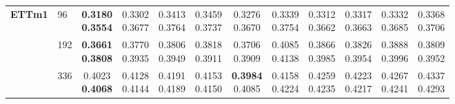 \begin{longtable}{@{}llcccccccccc@{}}
\textbf{ETTm1} & 96 & \shortstack{\colorbox[gray]{0.82}{\textbf{0.3180}}\\\colorbox[gray]{0.82}{\textbf{0.3554}}} & \shortstack{0.3302\\0.3677} & \shortstack{0.3413\\0.3764} & \shortstack{0.3459\\0.3737} & \shortstack{\colorbox[gray]{0.92}{0.3276}\\0.3670} & \shortstack{0.3339\\0.3754} & \shortstack{0.3312\\\colorbox[gray]{0.92}{0.3662}} & \shortstack{0.3317\\0.3663} & \shortstack{0.3332\\0.3685} & \shortstack{0.3368\\0.3706} \\ \cline{2-12}

 & 192 & \shortstack{\colorbox[gray]{0.82}{\textbf{0.3661}}\\\colorbox[gray]{0.82}{\textbf{0.3808}}} & \shortstack{0.3770\\0.3935} & \shortstack{0.3806\\0.3949} & \shortstack{0.3818\\0.3911} & \shortstack{\colorbox[gray]{0.92}{0.3706}\\\colorbox[gray]{0.92}{0.3909}} & \shortstack{0.4085\\0.4138} & \shortstack{0.3866\\0.3985} & \shortstack{0.3826\\0.3954} & \shortstack{0.3888\\0.3996} & \shortstack{0.3809\\0.3952} \\ \cline{2-12}

 & 336 & \shortstack{\colorbox[gray]{0.92}{0.4023}\\\colorbox[gray]{0.82}{\textbf{0.4068}}} & \shortstack{0.4128\\0.4144} & \shortstack{0.4191\\0.4189} & \shortstack{0.4153\\0.4150} & \shortstack{\colorbox[gray]{0.82}{\textbf{0.3984}}\\\colorbox[gray]{0.92}{0.4085}} & \shortstack{0.4158\\0.4224} & \shortstack{0.4259\\0.4235} & \shortstack{0.4223\\0.4217} & \shortstack{0.4267\\0.4241} & \shortstack{0.4337\\0.4293} \\ \cline{2-12}


\end{longtable}
